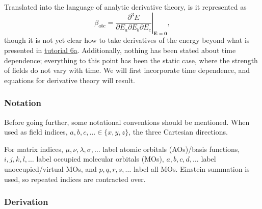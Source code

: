 Translated into the language of analytic derivative theory, is it represented as
\begin{equation}
  \beta_{abc} = \left.\frac{\partial^{3} E}{\partial E_a \partial E_b \partial E_c}\right|_{\mathbf{E}=\mathbf{0}},
\end{equation}
though it is not yet clear how to take derivatives of the energy beyond what is presented in \href{https://github.com/psi4/psi4numpy/blob/066f378f26240a4802371ef32849230853581329/Tutorials/06_Molecular_Properties/6a_CP-SCF.ipynb}{tutorial 6a}. Additionally, nothing has been stated about time dependence; everything to this point has been the static case, where the strength of fields do not vary with time. We will first incorporate time dependence, and equations for derivative theory will result.

\hypertarget{notation}{%
  \subsubsection{Notation}\label{notation}}

Before going further, some notational conventions should be mentioned.  When used as field indices, \(a,b,c,\dots \in \{x,y,z\}\), the three Cartesian directions.

For matrix indices, \(\mu,\nu,\lambda,\sigma,\dots\) label atomic orbitals (AOs)/basis functions, \(i,j,k,l,\dots\) label occupied molecular orbitals (MOs), \(a,b,c,d,\dots\) label unoccupied/virtual MOs, and \(p,q,r,s,\dots\) label all MOs. Einstein summation is used, so repeated indices are contracted over.

\subsubsection{Derivation}

